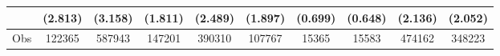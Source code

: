 {\begin{tabular}{l*{9}{c}}
                    &     (2.813)         &     (3.158)         &     (1.811)         &     (2.489)         &     (1.897)         &     (0.699)         &     (0.648)         &     (2.136)         &     (2.052)         \\
\hline
Obs       &      122365         &      587943         &      147201         &      390310         &      107767         &       15365         &       15583         &      474162         &      348223         \\
\hline\hline
\end{tabular}
}

